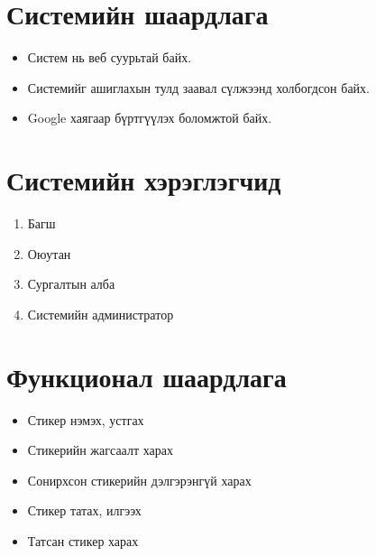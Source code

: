 \documentclass[12pt]{article}
\begin{document}
	\section{Системийн шаардлага}
	\begin{itemize}
		\item Систем нь веб суурьтай байх.
		\item Системийг ашиглахын тулд заавал сүлжээнд холбогдсон байх.
		\item Google хаягаар бүртгүүлэх боломжтой байх.
	\end{itemize}
	\section{Системийн хэрэглэгчид}
	\begin{enumerate}
		\item Багш
		\item Оюутан
		\item Сургалтын алба
		\item Системийн администратор
	\end{enumerate}
	\section{Функционал шаардлага}
		\begin{itemize}
			\item Стикер нэмэх, устгах
			\item Стикерийн жагсаалт харах
			\item Сонирхсон стикерийн дэлгэрэнгүй харах
			\item Стикер татах, илгээх
			\item Татсан стикер харах
		\end{itemize}
\end{document}
